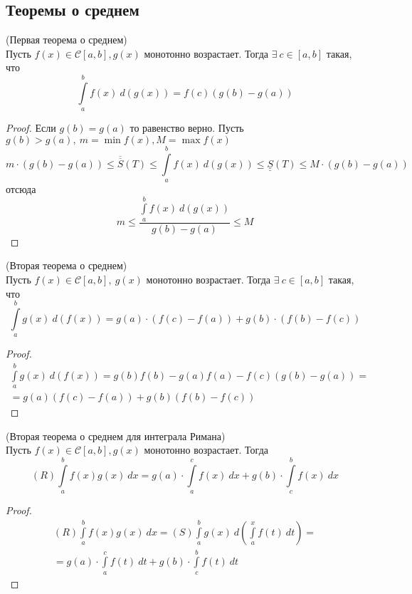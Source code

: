 \subsection{Теоремы о среднем}
\begin{theorem}
    (Первая теорема о среднем)\\ 
    Пусть $f(x)\in \mathcal{C}[a,b], g(x)$ монотонно возрастает. Тогда $\exists\ c\in [a,b]$ такая, что
    \[\int\limits_{a}^{b}f(x)\ d(g(x))=f(c)(g(b)-g(a))\]
\end{theorem} 
\begin{proof}
    Если $g(b)=g(a)$ то равенство верно.
    Пусть $g(b)>g(a),\ m=\min f(x), M=\max f(x)$
    \[m\cdot(g(b)-g(a))\leq\overline{\overline{S}}(T) \leq\int\limits_{a}^{b}f(x)\ d(g(x))\leq \underline{\underline{S}}(T)\leq M\cdot(g(b)-g(a))\]
    отсюда
    \[m\leq \frac{\int\limits_{a}^{b}f(x)\ d(g(x))}{g(b)- g(a)}\leq M\]
\end{proof} 
\begin{theorem}
    (Вторая теорема о среднем)\\
    Пусть $f(x)\in \mathcal{C}[a,b],\ g(x)$ монотонно возрастает. Тогда $\exists\ c\in [a,b]$ такая, что
    \[\int\limits_{a}^{b}g(x)\ d(f(x))=g(a)\cdot(f(c)-f(a))+g(b)\cdot (f(b)-f(c))\]
\end{theorem} 
\begin{proof}
    \begin{multline*}
        \int\limits_{a}^{b}g(x)\ d(f(x))=g(b)f(b)-g(a)f(a)-f(c)(g(b)-g(a))=\\=g(a)(f(c)-f(a))+g(b)(f(b)-f(c))
    \end{multline*}
\end{proof} 
\begin{consequense}
    (Вторая теорема о среднем для интеграла Римана)\\
    Пусть $f(x)\in \mathcal{C}[a,b], g(x)$ монотонно возрастает. Тогда
    \[(R)\int\limits_{a}^{b}f(x)g(x)\ dx=g(a)\cdot \int\limits_{a}^{c}f(x)\ dx+g(b)\cdot \int\limits_{c}^{b}f(x)\ dx\]
\end{consequense} 
\begin{proof}
    \begin{multline*}
        (R)\int\limits_{a}^{b}f(x)g(x)\ dx=(S) \int\limits_{a}^{b}g(x)\ d\left(\int\limits_{a}^{x}f(t)\ dt\right)=\\
        =g(a)\cdot \int\limits_{a}^{c}f(t)\ dt+g(b)\cdot \int\limits_{c}^{b}f(t)\ dt
    \end{multline*}
\end{proof} 
